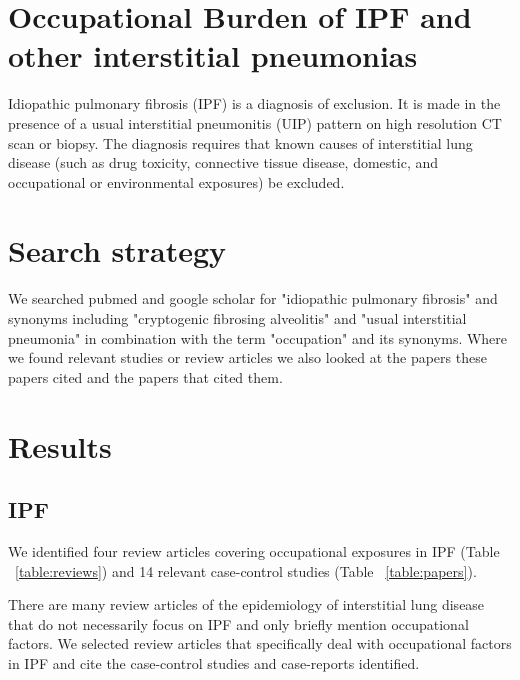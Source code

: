 \documentclass[a4paper,12pt]{article}
\author{Carl Reynolds \\
\small National Heart \& Lung Institute, Imperial College London }
\begin{document}



\section*{\centering Occupational Burden of IPF and other interstitial pneumonias}

Idiopathic pulmonary fibrosis (IPF) is a diagnosis of exclusion. It is made in the
presence of a usual interstitial pneumonitis (UIP) pattern on high resolution CT scan
or biopsy. The diagnosis requires that known causes of interstitial lung disease
(such as drug toxicity, connective tissue disease, domestic, and occupational or
environmental exposures) be excluded\cite{Travis2013}.



\section{Search strategy}

We searched pubmed and google scholar for "idiopathic pulmonary fibrosis" and synonyms including "cryptogenic fibrosing alveolitis" and "usual interstitial pneumonia" in combination with the term "occupation" and its synonyms. Where we found relevant studies or review articles we also looked at the papers these papers cited and the papers that cited them. 

\section{Results}

\subsection{IPF}
We identified four review articles covering occupational exposures in IPF (Table ~\ref{table:reviews})\cite{Turner-Warwick1998} and 14 relevant case-control studies (Table ~\ref{table:papers}).

There are many review articles of the epidemiology of interstitial lung disease that do not necessarily focus on IPF and only briefly mention occupational factors. We selected review articles that specifically deal with occupational factors in IPF and cite the case-control studies and case-reports identified.
\end{document}
